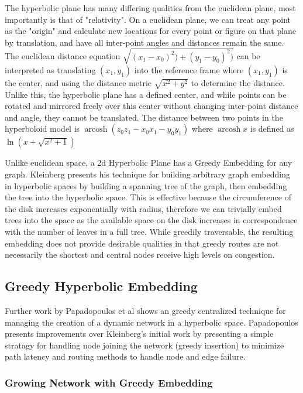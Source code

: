 The hyperbolic plane has many differing qualities from the euclidean plane, most importantly is that of "relativity".
On a euclidean plane, we can treat any point as the "origin" and calculate new locations for every point or figure on that plane by translation, and have all inter-point angles and distances remain the same.
The euclidean distance equation $\sqrt{(x_{1}-x_{0})^{2})+(y_{1}-y_{0})^{2})}$ can be interpreted as translating $(x_{1},y_{1})$ into the reference frame where $(x_{1},y_{1})$ is the center, and using the distance metric $\sqrt{x^{2}+y^{2}}$ to determine the distance.
Unlike this, the hyperbolic plane has a defined center, and while points can be rotated and mirrored freely over this center without changing inter-point distance and angle, they cannot be translated.
The distance between two points in the hyperboloid model is $\operatorname{arcosh}(z_{0}z_{1} - x_{0}x_{1} - y_{0}y_{1})$ where $\operatorname{arcosh}x$ is defined as $\ln{(x+\sqrt{x^{2}+1})}$

Unlike euclidean space, a 2d Hyperbolic Plane has a Greedy Embedding for any graph.
Kleinberg presents his technique for building arbitrary graph embedding in hyperbolic spaces by building a spanning tree of the graph, then embedding the tree into the hyperbolic space.
This is effective because the circumference of the disk increases exponentially with radius, therefore we can trivially embed trees into the space as the available space on the disk increases in correspondence with the number of leaves in a full tree.
While greedily traversable, the resulting embedding does not provide desirable qualities in that greedy routes are not necessarily the shortest and central nodes receive high levels on congestion.



\subsection{Greedy Hyperbolic Embedding}
Further work by Papadopoulos et al\cite{papadopoulos2010greedy} shows an greedy centralized technique for managing the creation of a dynamic network in a hyperbolic space.
Papadopoulos presents improvements over Kleinberg's initial work by presenting a simple stratagy for handling node joining the network (greedy insertion) to minimize path latency and routing methods to handle node and edge failure.



\subsubsection{Growing Network with Greedy Embedding}

